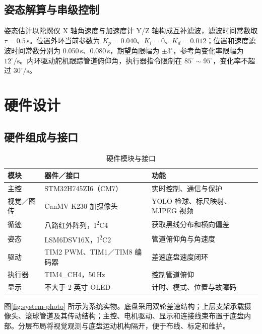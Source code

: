 \documentclass[UTF8,a4paper,12pt]{ctexart}
\begin{document}
\subsection{姿态解算与串级控制}

姿态估计以陀螺仪 X 轴角速度与加速度计 Y/Z 轴构成互补滤波，滤波时间常数取 $\tau=0.5\,\mathrm{s}$。位置外环当前参数为 $K_p=0.040$、$K_i=0$、$K_d=0.012$；位置和速度滤波时间常数分别为 0.050\,s、0.080\,s，期望角限幅为 $\pm3^\circ$，参考角变化率限幅为 $12^\circ/\mathrm{s}$。内环驱动舵机跟踪管道俯仰角，执行器指令限制在 $85^\circ\sim95^\circ$，变化率不超过 $30^\circ/\mathrm{s}$。

\section{硬件设计}

\subsection{硬件组成与接口}

\begin{table}[H]
  \centering
  \caption{硬件模块与接口}
  \label{tab:hardware}
  \begin{tabularx}{\textwidth}{>{\raggedright\arraybackslash}p{}>{\raggedright\arraybackslash}p{}X}
    \toprule
    模块 & 器件／接口 & 功能 \\
    \midrule
    主控 & STM32H745ZI6（CM7） & 实时控制、通信与保护 \\
    视觉／图传 & CanMV K230 加摄像头 & YOLO 检球、标尺映射、MJPEG 视频 \\
    循迹 & 八路红外阵列，I\textsuperscript{2}C4 & 获取黑线分布和横向偏差 \\
    姿态 & LSM6DSV16X，I\textsuperscript{2}C2 & 管道俯仰角与角速度 \\
    驱动 & TIM2 PWM、TIM1／TIM8 编码器 & 差速底盘速度闭环 \\
    执行器 & TIM4\_CH4，50\,Hz & 控制管道俯仰 \\
    显示 & 不大于 2 英寸 OLED & 计时、模式、位置与故障码 \\
    \bottomrule
  \end{tabularx}
\end{table}

图\ref{fig:system-photo} 所示为系统实物。底盘采用双轮差速结构；上层支架承载摄像头、滚球管道及其传动结构；主控、电机驱动、显示和连接线束布置于底盘内部。分层布局将视觉观测与底盘运动机构隔开，便于布线、标定和维护。
\end{document}
